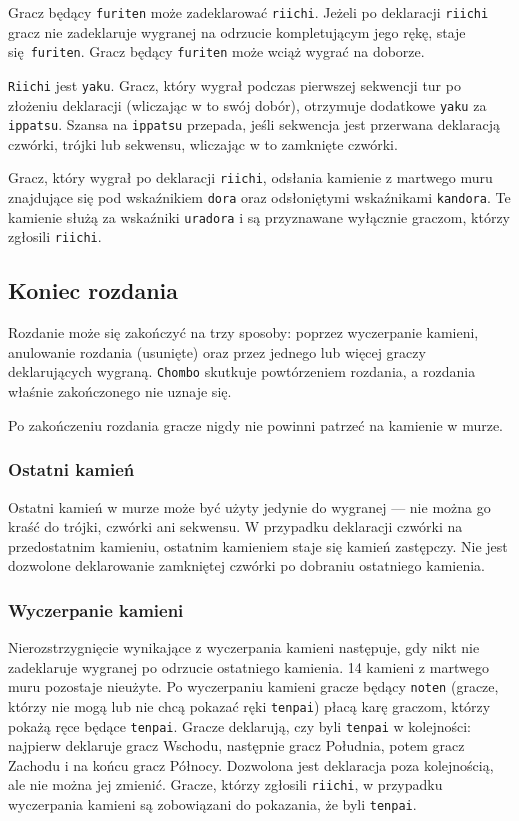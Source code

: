 Gracz będący \texttt{furiten} może zadeklarować \texttt{riichi}.
Jeżeli po deklaracji \texttt{riichi} gracz nie zadeklaruje wygranej na odrzucie
kompletującym jego rękę, staje się \texttt{furiten}.
Gracz będący \texttt{furiten} może wciąż wygrać na doborze.

\texttt{Riichi} jest \texttt{yaku}.
Gracz, który wygrał podczas pierwszej sekwencji tur po złożeniu deklaracji
(wliczając w to swój dobór), otrzymuje dodatkowe \texttt{yaku} za
\texttt{ippatsu}.
Szansa na \texttt{ippatsu} przepada, jeśli sekwencja jest przerwana deklaracją
czwórki, trójki lub sekwensu, wliczając w to zamknięte czwórki.

Gracz, który wygrał po deklaracji \texttt{riichi}, odsłania kamienie z martwego
muru znajdujące się pod wskaźnikiem \texttt{dora} oraz odsłoniętymi wskaźnikami
\texttt{kandora}.
Te kamienie służą za wskaźniki \texttt{uradora} i są przyznawane wyłącznie
graczom, którzy zgłosili \texttt{riichi}.

\subsection{Koniec rozdania}
Rozdanie może się zakończyć na trzy sposoby: poprzez wyczerpanie kamieni,
anulowanie rozdania (usunięte) oraz przez jednego lub więcej graczy
deklarujących wygraną.
\texttt{Chombo} skutkuje powtórzeniem rozdania, a rozdania właśnie zakończonego
nie uznaje się.

Po zakończeniu rozdania gracze nigdy nie powinni patrzeć na kamienie w murze.

\subsubsection{Ostatni kamień}
Ostatni kamień w murze może być użyty jedynie do wygranej --- nie można go kraść
do trójki, czwórki ani sekwensu.
W przypadku deklaracji czwórki na przedostatnim kamieniu, ostatnim kamieniem
staje się kamień zastępczy.
Nie jest dozwolone deklarowanie zamkniętej czwórki po dobraniu ostatniego
kamienia.

\subsubsection{Wyczerpanie kamieni}
Nierozstrzygnięcie wynikające z wyczerpania kamieni następuje, gdy nikt nie
zadeklaruje wygranej po odrzucie ostatniego kamienia.
14 kamieni z martwego muru pozostaje nieużyte.
Po wyczerpaniu kamieni gracze będący \texttt{noten} (gracze, którzy nie mogą lub
nie chcą pokazać ręki \texttt{tenpai}) płacą karę graczom, którzy pokażą ręce
będące \texttt{tenpai}.
Gracze deklarują, czy byli \texttt{tenpai} w kolejności: najpierw deklaruje
gracz Wschodu, następnie gracz Południa, potem gracz Zachodu i na końcu gracz
Północy.
Dozwolona jest deklaracja poza kolejnością, ale nie można jej zmienić.
Gracze, którzy zgłosili \texttt{riichi}, w przypadku wyczerpania kamieni są
zobowiązani do pokazania, że byli \texttt{tenpai}.

